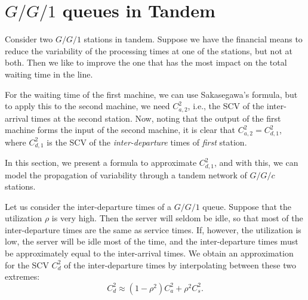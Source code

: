 


\section{$G/G/1$ queues in Tandem}
\label{sec:tandem-queues}


Consider two $G/G/1$ stations in tandem.
Suppose we have the financial means to reduce the variability of the processing times at  one of the stations, but not at both.
Then we like to improve the one that has the most impact on the total waiting time in the line.

For the waiting time of the first machine, we can use Sakasegawa's formula, but to apply this to the second machine, we need $C^2_{a,2}$, i.e., the SCV of the inter-arrival times at the second station.
Now, noting that the output of the first machine forms the input of the second machine, it is clear that $C^2_{a,2}=C^2_{d,1}$, where $C^2_{d,1}$ is the SCV of the \emph{inter-departure} times of \emph{first} station.

In this section, we  present a formula
 to approximate $C^2_{d,1}$, and with this, we can model the propagation of variability through a tandem network of $G/G/c$ stations.



Let us consider the inter-departure times of a $G/G/1$ queue.
Suppose that the  utilization $\rho$ is very high.
Then the server will seldom be idle, so that most of the inter-departure times are the same as service times.
If, however, the utilization is low, the server will be idle most of the time, and the inter-departure times must be approximately equal to the inter-arrival times.
We obtain an  approximation for the SCV $C_{d}^2$ of the inter-departure times by  interpolating between these two extremes: 
\begin{equation} \label{eq:40}
 C_{d}^2 \approx  (1-\rho^2) C_{a}^2 + \rho^2 C_{s}^2.
\end{equation}

